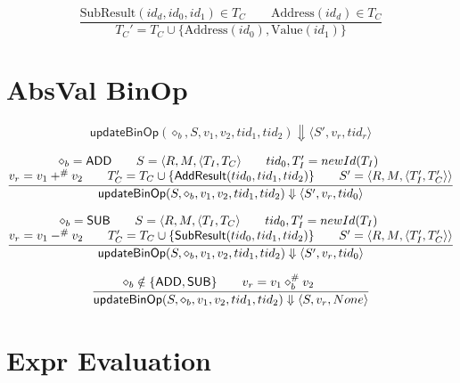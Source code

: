 \documentclass{article}
\begin{document}
\[
\frac{
    \mathrm{SubResult}(id_d,id_0,id_1)\in T_C
    \qquad \mathrm{Address}(id_d) \in T_C
}{
    T_C' = T_C \cup \{\mathrm{Address}(id_0), \mathrm{Value}(id_1)\}
}
\]

\section{AbsVal BinOp}

\[ \mathsf{updateBinOp}(\diamond_b,S,v_1,v_2,tid_1,tid_2)\Downarrow \langle S',v_r,tid_r \rangle \]

\[
\frac{
    \begin{array}{@{}c@{}}
        \diamond_b=\mathsf{ADD} \qquad
        S=\langle R,M,\langle T_I, T_C \rangle\qquad
        tid_0, T_I' = newId(T_I)\qquad\\
        v_r=v_1 +^\# v_2\qquad
        T_C'=T_C\cup\{\mathsf{AddResult}(tid_0,tid_1,tid_2)\}\qquad
        S'=\langle R,M,\langle T_I',T_C'\rangle\rangle
    \end{array}
} {
    \mathsf{updateBinOp}(S,\diamond_b,v_1,v_2,tid_1,tid_2)
    \Downarrow \langle S',v_r,tid_0\rangle
}
\]

\[
\frac{
    \begin{array}{@{}c@{}}
        \diamond_b=\mathsf{SUB} \qquad
        S=\langle R,M,\langle T_I, T_C \rangle\qquad
        tid_0, T_I' = newId(T_I)\qquad\\
        v_r=v_1 -^\# v_2\qquad
        T_C'=T_C\cup\{\mathsf{SubResult}(tid_0,tid_1,tid_2)\}\qquad
        S'=\langle R,M,\langle T_I',T_C'\rangle\rangle
    \end{array}
} {
    \mathsf{updateBinOp}(S,\diamond_b,v_1,v_2,tid_1,tid_2)
    \Downarrow \langle S',v_r,tid_0\rangle
}
\]

\[
\frac{
    \begin{array}{@{}c@{}}
        \diamond_b\notin\{\mathsf{ADD},\mathsf{SUB}\} \qquad
        v_r=v_1 \diamond_b^\# v_2\qquad
    \end{array}
} {
    \mathsf{updateBinOp}(S,\diamond_b,v_1,v_2,tid_1,tid_2)
    \Downarrow \langle S,v_r,None\rangle
}
\]

\newpage

\section{Expr Evaluation}
\end{document}
